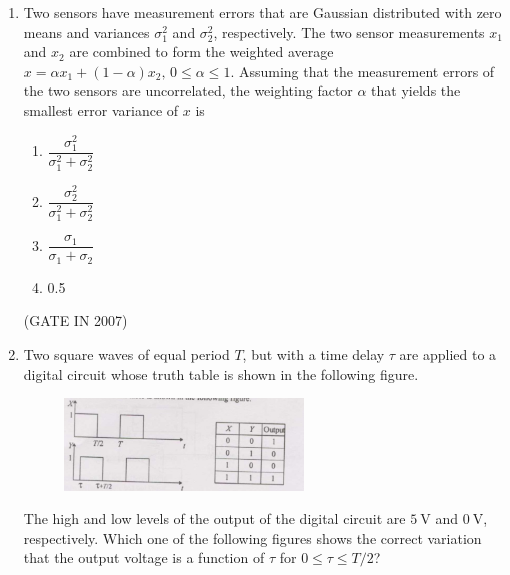 \documentclass[journal]{IEEEtran}
\begin{document}
\begin{enumerate}
\item Two sensors have measurement errors that are Gaussian distributed with zero means and variances $\sigma_1^2$ and $\sigma_2^2$, respectively. The two sensor measurements $x_1$ and $x_2$ are combined to form the weighted average $x = \alpha x_1 + (1-\alpha)x_2, \, 0 \leq \alpha \leq 1$. Assuming that the measurement errors of the two sensors are uncorrelated, the weighting factor $\alpha$ that yields the smallest error variance of $x$ is  
\begin{multicols}{4}
\begin{enumerate}
\item $\dfrac{\sigma_1^2}{\sigma_1^2 + \sigma_2^2}$  
\item $\dfrac{\sigma_2^2}{\sigma_1^2 + \sigma_2^2}$  
\item $\dfrac{\sigma_1}{\sigma_1 + \sigma_2}$  
\item 0.5  
\end{enumerate}
\end{multicols}
\hfill(GATE IN 2007)
\item Two square waves of equal period $T$, but with a time delay $\tau$ are applied to a digital circuit whose truth table is shown in the following figure.  
\begin{figure}[H]
    \centering
      \includegraphics[width=0.6\textwidth]{15.jpg} 
      \caption{}
    \label{fig:fig15} 
\end{figure}
The high and low levels of the output of the digital circuit are $5\ \mathrm{V}$ and $0\ \mathrm{V}$, respectively. Which one of the following figures shows the correct variation that the output voltage is a function of $\tau$ for $0 \leq \tau \leq T/2$?


\end{enumerate}
\end{document}
